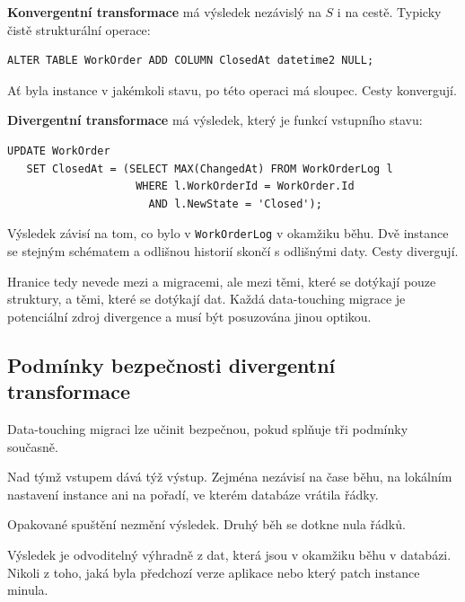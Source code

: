 \documentclass[11pt,a4paper]{article}
\begin{document}
\textbf{Konvergentní transformace} má výsledek nezávislý na $S$ i na cestě.
Typicky čistě strukturální operace:

\begin{lstlisting}
ALTER TABLE WorkOrder ADD COLUMN ClosedAt datetime2 NULL;
\end{lstlisting}

\noindent
Ať byla instance v jakémkoli stavu, po této operaci má sloupec. Cesty
konvergují.

\textbf{Divergentní transformace} má výsledek, který je funkcí vstupního
stavu:

\begin{lstlisting}
UPDATE WorkOrder
   SET ClosedAt = (SELECT MAX(ChangedAt) FROM WorkOrderLog l
                    WHERE l.WorkOrderId = WorkOrder.Id
                      AND l.NewState = 'Closed');
\end{lstlisting}

\noindent
Výsledek závisí na tom, co bylo v \texttt{WorkOrderLog} v okamžiku běhu.
Dvě instance se stejným schématem a odlišnou historií skončí s odlišnými
daty. Cesty divergují.

Hranice tedy nevede mezi  a  migracemi, ale mezi
těmi, které se dotýkají pouze struktury, a těmi, které se dotýkají dat.
Každá data-touching migrace je potenciální zdroj divergence a musí být
posuzována jinou optikou.

\subsection{Podmínky bezpečnosti divergentní transformace}

Data-touching migraci lze učinit bezpečnou, pokud splňuje tři podmínky
současně.

\begin{description}[leftmargin=2em,style=nextline]
\item[Determinismus]
Nad týmž vstupem dává týž výstup. Zejména nezávisí na čase běhu,
na lokálním nastavení instance ani na pořadí, ve kterém databáze
vrátila řádky.

\item[Idempotence]
Opakované spuštění nezmění výsledek. Druhý běh se dotkne nula řádků.

\item[Čistota vzhledem ke vstupnímu stavu]
Výsledek je odvoditelný výhradně z dat, která jsou v okamžiku běhu
v databázi. Nikoli z toho, jaká byla předchozí verze aplikace nebo
který patch instance minula.
\end{description}
\end{document}
